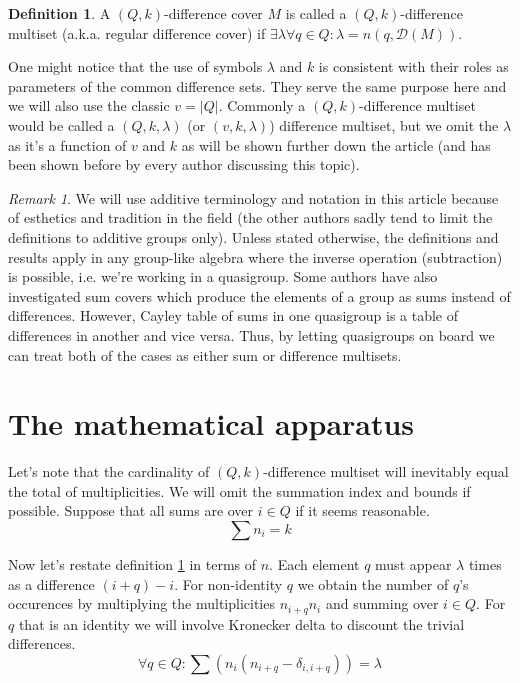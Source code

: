 \documentclass{article}
\theoremstyle{plain}
\theoremstyle{definition}
\newtheorem{definition}[theorem]{Definition}
\theoremstyle{remark}
\newtheorem{remark}[theorem]{Remark}
\begin{document}
		\begin{definition}
			\label{dms:def:dms}
			A $(Q,k)$-difference cover $M$ is called a $(Q,k)$-difference multiset (a.k.a. regular difference cover) if $\exists \lambda  \forall q \in Q \colon \lambda = n(q, \mathcal D(M))$.
		\end{definition}
		
		One might notice that the use of symbols $\lambda$ and $k$ is consistent with their roles as parameters of the common difference sets. They serve the same purpose here and we will also use the classic $v = |Q|$. Commonly a $(Q,k)$-difference multiset would be called a $(Q,k,\lambda)$ (or $(v,k,\lambda)$) difference multiset, but we omit the $\lambda$ as it's a function of $v$ and $k$ as will be shown further down the article (and has been shown before by every author discussing this topic).
		
		\begin{remark}
			\label{dms:remark:abelian}
			We will use additive terminology and notation in this article because of esthetics and tradition in the field (the other authors sadly tend to limit the definitions to additive groups only). Unless stated otherwise, the definitions and results apply in any group-like algebra where the inverse operation (subtraction) is possible, i.e. we're working in a quasigroup.
			Some authors \cite{haanpaa2004minimum} have also investigated sum covers which produce the elements of a group as sums instead of differences. However, Cayley table of sums in one quasigroup is a table of differences in another and vice versa. Thus, by letting quasigroups on board we can treat both of the cases as either sum or difference multisets.
		\end{remark}
	
	\section{The mathematical apparatus}
		Let's note that the cardinality of $(Q,k)$-difference multiset will inevitably equal the total of multiplicities. We will omit the summation index and bounds if possible. Suppose that all sums are over $i \in Q$ if it seems reasonable.
		\begin{equation}
			\label{apparatus:eq:ni}
			\sum {n_i} = k
		\end{equation}
		
		Now let's restate definition \ref{dms:def:dms} in terms of $n$. Each element $q$ must appear $\lambda$ times as a difference $(i+q)-i$. For non-identity $q$ we obtain the number of $q$'s occurences by multiplying the multiplicities $n_{i+q} n_i$ and summing over $i \in Q$. For $q$ that is an identity we will involve Kronecker delta to discount the trivial differences.
		\begin{equation}
			\label{apparatus:eq:system}
			\forall q \in Q \colon \sum (n_i(n_{i+q}-\delta_{i,i+q})) = \lambda
		\end{equation}
		
\end{document}
